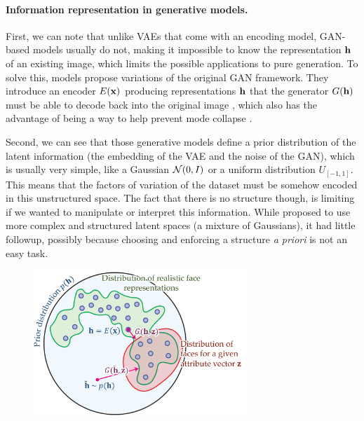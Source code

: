 \paragraph{Information representation in generative models.} 

First, we can note that unlike \acp{VAE} that come with an encoding model, \ac{GAN}-based models usually do not, making it impossible to know the representation $\mathbf{h}$ of an existing image, which limits the possible applications to pure generation. To solve this, models propose variations of the original \ac{GAN} framework. They introduce an encoder $E(\mathbf{x})$ producing representations $\mathbf{h}$ that the generator $G(\mathbf{h})$ must be able to decode back into the original image \citep{Dumoulin2016,Donahue2016,brock2018large}, which also has the advantage of being a way to help prevent mode collapse \citep{rosca2017variational,bang2018mggan}.

Second, we can see that those generative models define a prior distribution of the latent information (the embedding of the \ac{VAE} and the noise of the \ac{GAN}), which is usually very simple, like a Gaussian $\mathcal{N}(0,I)$ or a uniform distribution $U_{[-1,1]}$. This means that the factors of variation of the dataset must be somehow encoded in this unstructured space. The fact that there is no structure though, is limiting if we wanted to manipulate or interpret this information. While \citet{Makhzani2016} proposed to use more complex and structured latent spaces (\eg a mixture of Gaussians), it had little followup, possibly because choosing and enforcing a structure \textit{a priori} is not an easy task.

\begin{figure}[tb]
    \centering
    \hspace{0.13\textwidth}\includegraphics[width=0.72\textwidth]{images/dualdis_engel}
    \label{dualdis:fig:engel}
\end{figure}

